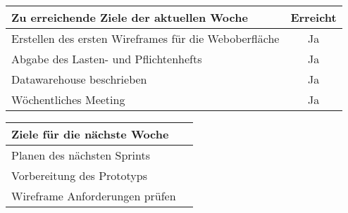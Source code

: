 \begin{tabularx}{\textwidth}{Xc}
    \arrayrulecolor{OliveGreen}
    \toprule
    {\bfseries Zu erreichende Ziele der aktuellen Woche} & {\bfseries Erreicht} \\
    \midrule[2pt]
    Erstellen des ersten Wireframes für die Weboberfläche  &Ja               \\
    \rowcolor{OliveGreen!15}
    Abgabe des Lasten- und Pflichtenhefts                  &Ja               \\
    \rowcolor{White}
    Datawarehouse beschrieben                              &Ja               \\
    \rowcolor{OliveGreen!15}
    Wöchentliches Meeting                                  &Ja               \\
   \bottomrule[2pt]
\end{tabularx}
%
\vspace{1cm}
%
\begin{tabularx}{\textwidth}{Xc}
    \arrayrulecolor{OliveGreen}
    \toprule
    {\bfseries Ziele für die nächste Woche}              &                   \\
    \midrule[2pt]
    Planen des nächsten Sprints                          &                   \\
    \rowcolor{OliveGreen!15}
    Vorbereitung des Prototyps                           &                   \\
    \rowcolor{White}
    Wireframe Anforderungen prüfen & \\
\end{tabularx}
